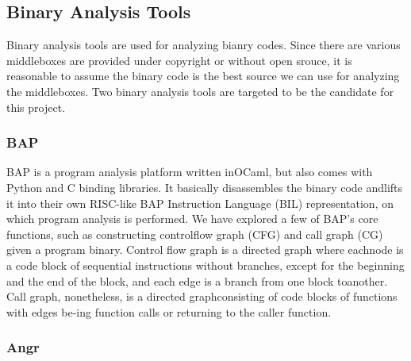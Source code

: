 \subsection{Binary Analysis Tools}
Binary analysis tools are used for analyzing bianry codes.
Since there are various middleboxes are provided under copyright or without open srouce, it is reasonable to assume the binary code is the best source we can use for analyzing the middleboxes.
Two binary analysis tools are targeted to be the candidate for this project.

\subsubsection{BAP}
BAP is a program analysis platform written inOCaml, but also comes with Python and C binding libraries.
It basically disassembles the binary code andlifts it into their own RISC-like BAP Instruction Language (BIL) representation, on which program analysis is performed. 
We have explored a few of BAP’s core functions, such as constructing controlflow graph (CFG) and call graph (CG) given a program binary.
Control flow graph is a directed graph where eachnode is a code block of sequential instructions without branches, except for the beginning and the end of the block, and each edge is a branch from one block toanother.
Call graph,  nonetheless,  is a directed graphconsisting of code blocks of functions with edges be-ing function calls or returning to the caller function.

\subsubsection{Angr}

